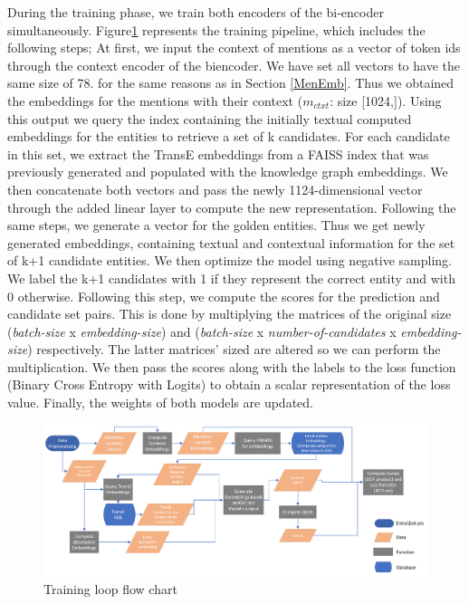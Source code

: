 During the training phase, we train both encoders of the bi-encoder simultaneously.\newline
Figure\ref{Training loop} represents the training pipeline, which includes the following steps;\newline
At first, we input the context of mentions as a vector of token ids through the context encoder of the biencoder. We have set all vectors to have the same size of 78. for the same reasons as in Section \ref{MenEmb}. Thus we obtained the embeddings for the mentions with their context ($m_{ctxt}$: size [1024,]).\newline
Using this output we query the index containing the initially textual computed embeddings for the entities to retrieve a set of k candidates. For each candidate in this set, we extract the TransE embeddings from a FAISS index that was previously generated and populated with the knowledge graph embeddings. We then concatenate both vectors and pass the newly 1124-dimensional vector through the added linear layer to compute the new representation. Following the same steps, we generate a vector for the golden entities. Thus we get newly generated embeddings, containing textual and contextual information for the set of k+1 candidate entities.\newline 
We then optimize the model using negative sampling. We label the k+1 candidates with 1 if they represent the correct entity and with 0 otherwise. Following this step, we compute the scores for the prediction and candidate set pairs. This is done by multiplying the matrices of the original size (\textit{batch-size} x \textit{embedding-size}) and (\textit{batch-size} x \textit{number-of-candidates} x \textit{embedding-size}) respectively. The latter matrices' sized are altered so we can perform the multiplication. We then pass the scores along with the labels to the loss function (Binary Cross Entropy with Logits) to obtain a scalar representation of the loss value.\newline
Finally, the weights of both models are updated.\newline

\begin{figure}[h]
\centering
\includegraphics[width=17cm]{figures/TrainingFlowChart.png}
\caption{Training loop flow chart}
\label{Training loop}
\end{figure}

